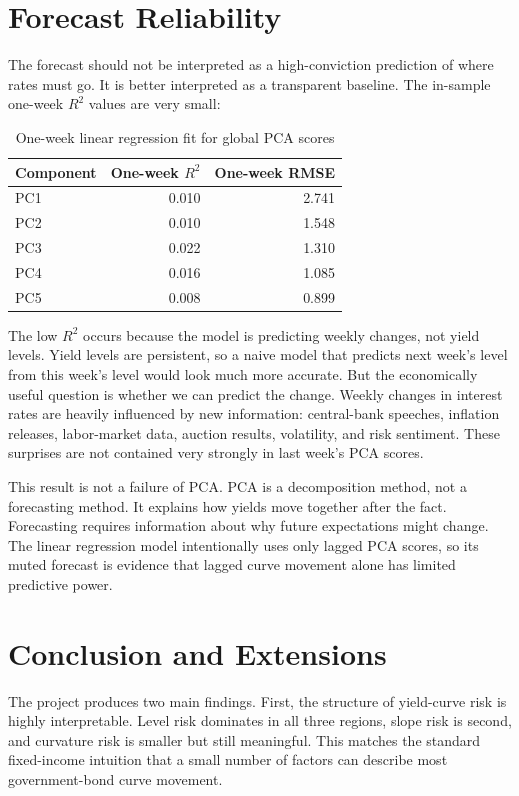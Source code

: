 \documentclass[11pt]{article}
\begin{document}
\section{Forecast Reliability}

The forecast should not be interpreted as a high-conviction prediction of where rates must go. It is better interpreted as a transparent baseline. The in-sample one-week $R^2$ values are very small:

\begin{table}[htbp]
\centering
\caption{One-week linear regression fit for global PCA scores}
\small
\begin{tabular}{lrr}
\toprule
Component & One-week $R^2$ & One-week RMSE \\
\midrule
PC1 & 0.010 & 2.741 \\
PC2 & 0.010 & 1.548 \\
PC3 & 0.022 & 1.310 \\
PC4 & 0.016 & 1.085 \\
PC5 & 0.008 & 0.899 \\
\bottomrule
\end{tabular}
\end{table}

The low $R^2$ occurs because the model is predicting weekly changes, not yield levels. Yield levels are persistent, so a naive model that predicts next week's level from this week's level would look much more accurate. But the economically useful question is whether we can predict the change. Weekly changes in interest rates are heavily influenced by new information: central-bank speeches, inflation releases, labor-market data, auction results, volatility, and risk sentiment. These surprises are not contained very strongly in last week's PCA scores.

This result is not a failure of PCA. PCA is a decomposition method, not a forecasting method. It explains how yields move together after the fact. Forecasting requires information about why future expectations might change. The linear regression model intentionally uses only lagged PCA scores, so its muted forecast is evidence that lagged curve movement alone has limited predictive power.

\section{Conclusion and Extensions}

The project produces two main findings. First, the structure of yield-curve risk is highly interpretable. Level risk dominates in all three regions, slope risk is second, and curvature risk is smaller but still meaningful. This matches the standard fixed-income intuition that a small number of factors can describe most government-bond curve movement.
\end{document}
